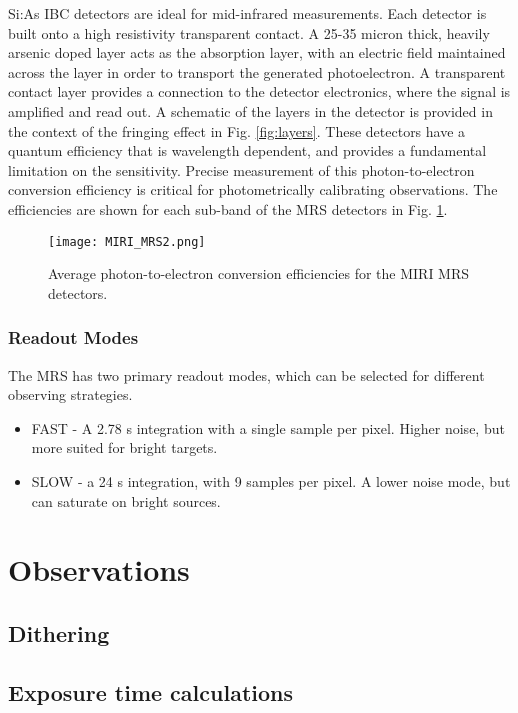 Si:As IBC detectors are ideal for mid-infrared measurements.
Each detector is built onto a high resistivity transparent contact. 
A 25-35 micron thick, heavily arsenic doped layer acts as the absorption layer, with an electric field maintained across the layer in order to transport the generated photoelectron.
A transparent contact layer provides a connection to the detector electronics, where the signal is amplified and read out.
A schematic of the layers in the detector is provided in the context of the fringing effect in Fig. \ref{fig:layers}.
These detectors have a quantum efficiency that is wavelength dependent, and provides a fundamental limitation on the sensitivity.
Precise measurement of this photon-to-electron conversion efficiency is critical for photometrically calibrating observations. 
The efficiencies are shown for each sub-band of the MRS detectors in Fig. \ref{fig:mirideteff}.
\begin{figure}[t]
	\texttt{[image: MIRI\_MRS2.png]}
	\caption{Average photon-to-electron conversion efficiencies for the MIRI MRS detectors.}
	\label{fig:mirideteff}
\end{figure}
\subsubsection{Readout Modes}
The MRS has two primary readout modes, which can be selected for different observing strategies.
\begin{itemize}
	\item FAST - A 2.78 s integration with a single sample per pixel. Higher noise, but more suited for bright targets.
	\item SLOW - a 24 s integration, with 9 samples per pixel. A lower noise mode, but can saturate on bright sources.
\end{itemize}

\section{Observations}
\subsection{Dithering}
\subsection{Exposure time calculations}
